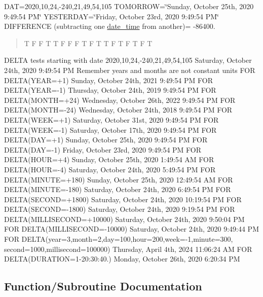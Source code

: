 D\+AT=2020,10,24,-\/240,21,49,54,105 T\+O\+M\+O\+R\+R\+OW=\char`\"{}\+Sunday, October 25th, 2020 9\+:49\+:54 P\+M\char`\"{} Y\+E\+S\+T\+E\+R\+D\+AY=\char`\"{}\+Friday, October 23rd, 2020 9\+:49\+:54 P\+M\char`\"{} D\+I\+F\+F\+E\+R\+E\+N\+CE (subtracting one \mbox{\hyperlink{structm__time__oop_1_1date__time}{date\+\_\+time}} from another)= -\/86400. \begin{quote}
T F F T T F F F T F T T F T F T F T \end{quote}


D\+E\+L\+TA tests starting with date 2020,10,24,-\/240,21,49,54,105 Saturday, October 24th, 2020 9\+:49\+:54 PM Remember years and months are not constant units F\+OR D\+E\+L\+TA(Y\+E\+AR=+1) Sunday, October 24th, 2021 9\+:49\+:54 PM F\+OR D\+E\+L\+TA(Y\+E\+AR=-\/1) Thursday, October 24th, 2019 9\+:49\+:54 PM F\+OR D\+E\+L\+TA(M\+O\+N\+TH=+24) Wednesday, October 26th, 2022 9\+:49\+:54 PM F\+OR D\+E\+L\+TA(M\+O\+N\+TH=-\/24) Wednesday, October 24th, 2018 9\+:49\+:54 PM F\+OR D\+E\+L\+TA(W\+E\+EK=+1) Saturday, October 31st, 2020 9\+:49\+:54 PM F\+OR D\+E\+L\+TA(W\+E\+EK=-\/1) Saturday, October 17th, 2020 9\+:49\+:54 PM F\+OR D\+E\+L\+TA(D\+AY=+1) Sunday, October 25th, 2020 9\+:49\+:54 PM F\+OR D\+E\+L\+TA(D\+AY=-\/1) Friday, October 23rd, 2020 9\+:49\+:54 PM F\+OR D\+E\+L\+TA(H\+O\+UR=+4) Sunday, October 25th, 2020 1\+:49\+:54 AM F\+OR D\+E\+L\+TA(H\+O\+UR=-\/4) Saturday, October 24th, 2020 5\+:49\+:54 PM F\+OR D\+E\+L\+TA(M\+I\+N\+U\+TE=+180) Sunday, October 25th, 2020 12\+:49\+:54 AM F\+OR D\+E\+L\+TA(M\+I\+N\+U\+TE=-\/180) Saturday, October 24th, 2020 6\+:49\+:54 PM F\+OR D\+E\+L\+TA(S\+E\+C\+O\+ND=+1800) Saturday, October 24th, 2020 10\+:19\+:54 PM F\+OR D\+E\+L\+TA(S\+E\+C\+O\+ND=-\/1800) Saturday, October 24th, 2020 9\+:19\+:54 PM F\+OR D\+E\+L\+TA(M\+I\+L\+L\+I\+S\+E\+C\+O\+ND=+10000) Saturday, October 24th, 2020 9\+:50\+:04 PM F\+OR D\+E\+L\+TA(M\+I\+L\+L\+I\+S\+E\+C\+O\+ND=-\/10000) Saturday, October 24th, 2020 9\+:49\+:44 PM F\+OR D\+E\+L\+TA(year=3,month=2,day=100,hour=200,week=-\/1,minute=300, second=1000,millisecond=100000) Thursday, April 4th, 2024 11\+:06\+:24 AM F\+OR D\+E\+L\+TA(D\+U\+R\+A\+T\+I\+ON=\textquotesingle{}1-\/20\+:30\+:40.\textquotesingle{}) Monday, October 26th, 2020 6\+:20\+:34 PM 

\subsection{Function/\+Subroutine Documentation}
\mbox{\label{namespacem__time__oop_ae43c4146d74863b5aee027ebc0103f48}} 
